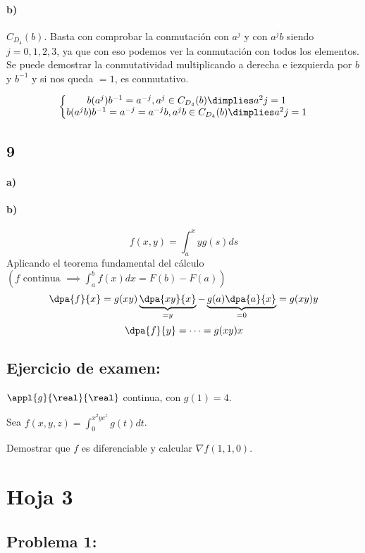 \documentclass{apuntes}
\begin{document}
\paragraph{b)}
$C_{D_4}(b)$. Basta con comprobar la conmutación con $a^j$ y con $a^jb$ siendo $j = 0,1,2,3$, ya que con eso podemos ver la conmutación con todos los elementos. Se puede demostrar la conmutatividad multiplicando a derecha e iezquierda por $b$ y $b^{-1}$ y si nos queda $=1$, es conmutativo.

$$\left\{\begin{matrix}b(a^j)b^{-1} = a^{-j}, a^j \in C_{D_4}(b) \dimplies a^2j = 1\\
b(a^jb)b^{-1} = a^{-j} = a^{-j}b, a^jb \in C_{D_4}(b) \dimplies a^2j = 1\end{matrix}\right.$$

\subsection{9}
\paragraph{a)}
\paragraph{b)}

$$f(x,y) = \int_a^xy g(s)ds$$
Aplicando el teorema fundamental del cálculo $\left(f \text{ continua } \implies\displaystyle\int_a^b f(x)dx = F(b)-F(a)\right)$
$$\dpa{f}{x} = g(xy)\underbrace{\dpa{xy}{x}}_{=y} - \underbrace{g(a)\dpa{a}{x}}_{=0}  = g(xy)y$$
$$\dpa{f}{y} = \cdots  = g(xy)x$$

\subsection{Ejercicio de examen:}
$\appl{g}{\real}{\real}$ continua, con $g(1) = 4$.

Sea $f(x,y,z)=\displaystyle \int_0^{x^2ye^z} g(t)dt$.

Demostrar que $f$ es diferenciable y calcular $\nabla f(1,1,0)$.

\section{Hoja 3}

\subsection{Problema 1:}
\end{document}
